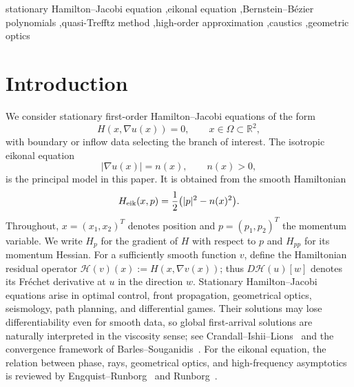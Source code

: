 \documentclass[preprint,12pt]{elsarticle}
\newcommand{\Rn}{\mathbb R}
\newcommand{\grad}{\nabla}
\newcommand{\abs}[1]{\left\lvert #1\right\rvert}
\begin{document}
\begin{frontmatter}
\begin{keyword}
stationary Hamilton--Jacobi equation \sep eikonal equation \sep Bernstein--B\'ezier polynomials \sep quasi-Trefftz method \sep high-order approximation \sep caustics \sep geometric optics
\end{keyword}
\end{frontmatter}

\section{Introduction}
We consider stationary first-order Hamilton--Jacobi equations of the form
\begin{equation}\label{eq:HJ}
  H(x,\grad u(x))=0,\qquad x\in\Omega\subset\Rn^2,
\end{equation}
with boundary or inflow data selecting the branch of interest.  The isotropic eikonal equation
\begin{equation}\label{eq:eikonal}
  \abs{\grad u(x)}=n(x),\qquad n(x)>0,
\end{equation}
is the principal model in this paper.  It is obtained from the smooth Hamiltonian
\begin{equation}\label{eq:Heik}
 H_{\rm eik}(x,p)=\frac12\bigl(|p|^2-n(x)^2\bigr).
\end{equation}
Throughout, $x=(x_1,x_2)^T$ denotes position and $p=(p_1,p_2)^T$ the momentum variable.  We write $H_p$ for the gradient of $H$ with respect to $p$ and $H_{pp}$ for its momentum Hessian.  For a sufficiently smooth function $v$, define the Hamiltonian residual operator $\mathcal H(v)(x):=H(x,\grad v(x))$; thus $D\mathcal H(u)[w]$ denotes its Fr\'echet derivative at $u$ in the direction $w$.
Stationary Hamilton--Jacobi equations arise in optimal control, front propagation, geometrical optics, seismology, path planning, and differential games.  Their solutions may lose differentiability even for smooth data, so global first-arrival solutions are naturally interpreted in the viscosity sense; see Crandall--Ishii--Lions~\cite{CrandallIshiiLions1992} and the convergence framework of Barles--Souganidis~\cite{BarlesSouganidis1991}.  For the eikonal equation, the relation between phase, rays, geometrical optics, and high-frequency asymptotics is reviewed by Engquist--Runborg~\cite{EngquistRunborg2003} and Runborg~\cite{Runborg2007}.
\end{document}
